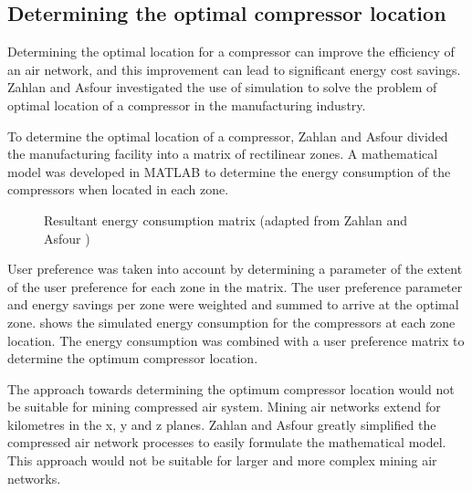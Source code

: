 \subsection{Determining the optimal compressor location}
Determining the optimal location for a compressor can improve the efficiency of an air network, and this improvement can lead to significant energy cost savings. Zahlan and Asfour \cite{zahlan2015multi} investigated the use of simulation to solve the problem of optimal location of a compressor in the manufacturing industry.
\par 
To determine the optimal location of a compressor, Zahlan and Asfour divided the manufacturing facility into a matrix of rectilinear zones. A mathematical model was developed in MATLAB to determine the energy consumption of the compressors when located in each zone.
\par
\begin{figure}[!htbp]
	\centering
	\caption[Simulated energy consumption matrix]{Resultant energy consumption matrix (adapted from Zahlan and Asfour \cite{zahlan2015multi})}
	\label{fig: EnergyconsumptionMatrix}
\end{figure} 
User preference was taken into account by determining a parameter of the extent of the user preference for each zone in the matrix. The user preference parameter and energy savings per zone were weighted and summed to arrive at the optimal zone.  shows the simulated energy consumption for the compressors at each zone location. The energy consumption was combined with a user preference matrix to determine the optimum compressor location.
\par
The approach towards determining the optimum compressor location would not be suitable for mining compressed air system. Mining air networks extend for kilometres in the x, y and z planes. Zahlan and Asfour \cite{zahlan2015multi} greatly simplified the compressed air network processes to easily formulate the mathematical model. This approach would not be suitable for larger and more complex mining air networks.

